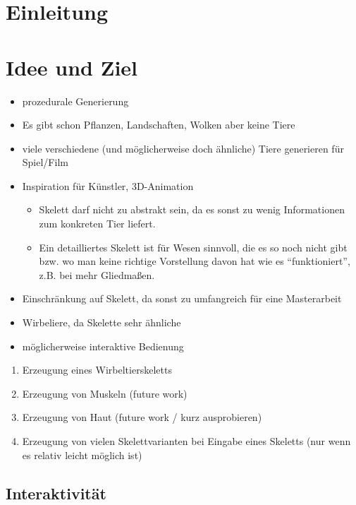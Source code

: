\chapter{Einleitung}


\chapter{Idee und Ziel}

\begin{itemize}
 \item prozedurale Generierung
 \item Es gibt schon Pflanzen, Landschaften, Wolken \etc aber keine Tiere
 \item viele verschiedene (und möglicherweise doch ähnliche) Tiere generieren für Spiel/Film
 \item Inspiration für Künstler, 3D-Animation
    \begin{itemize}
     \item Skelett darf nicht zu abstrakt sein, da es sonst zu wenig Informationen zum konkreten Tier liefert.
     \item Ein detailliertes Skelett ist für Wesen sinnvoll, die es so noch nicht gibt bzw. wo man keine richtige Vorstellung davon hat wie es "`funktioniert"', z.B. bei mehr Gliedmaßen.
    \end{itemize}
 \item Einschränkung auf Skelett, da sonst zu umfangreich für eine Masterarbeit
 \item Wirbeliere, da Skelette sehr ähnliche
 \item möglicherweise interaktive Bedienung
\end{itemize}

\begin{enumerate}
 \item Erzeugung eines Wirbeltierskeletts
 \item Erzeugung von Muskeln (future work)
 \item Erzeugung von Haut (future work / kurz ausprobieren)
 \item Erzeugung von vielen Skelettvarianten bei Eingabe eines Skeletts (nur wenn es relativ leicht möglich ist)
\end{enumerate}

\section{Interaktivität}

